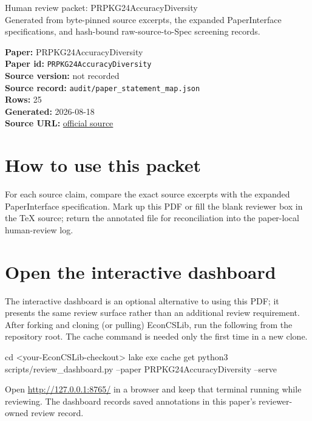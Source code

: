 \documentclass[10pt]{article}
\begin{document}
\fontsize{9}{10}\selectfont

\begin{center}
{\LARGE Human review packet: PRPKG24AccuracyDiversity}\\[0.35em]
\small Generated from byte-pinned source excerpts, the expanded PaperInterface
specifications, and hash-bound raw-source-to-Spec screening records.
\end{center}

\noindent\textbf{Paper:} PRPKG24AccuracyDiversity\\
\textbf{Paper id:} \texttt{PRPKG24AccuracyDiversity}\\
\textbf{Source version:} not recorded\\
\textbf{Source record:} \texttt{audit/paper\_statement\_map.json}\\
\textbf{Rows:} 25\\
\textbf{Generated:} 2026-08-18\\
\textbf{Source URL:} \href{https://arxiv.org/pdf/2307.15142}{official source}

\noindent{}\par



\section*{How to use this packet}
For each source claim, compare the exact source excerpts with the expanded
PaperInterface specification. Mark up this PDF or fill the blank reviewer box in the TeX source;
return the annotated file for reconciliation into the paper-local human-review
log.

\section*{Open the interactive dashboard}
The interactive dashboard is an optional alternative to using this PDF; it
presents the same review surface rather than an additional review requirement.
After forking and cloning (or pulling) EconCSLib, run the following from the
repository root. The cache command is needed only the first time in a new clone.
\begin{ReviewVerbatim}
cd <your-EconCSLib-checkout>
lake exe cache get
python3 scripts/review_dashboard.py --paper PRPKG24AccuracyDiversity --serve
\end{ReviewVerbatim}
Open \url{http://127.0.0.1:8765/} in a browser and keep that terminal running
while reviewing. The dashboard records saved annotations in this paper's
reviewer-owned review record.
\end{document}
